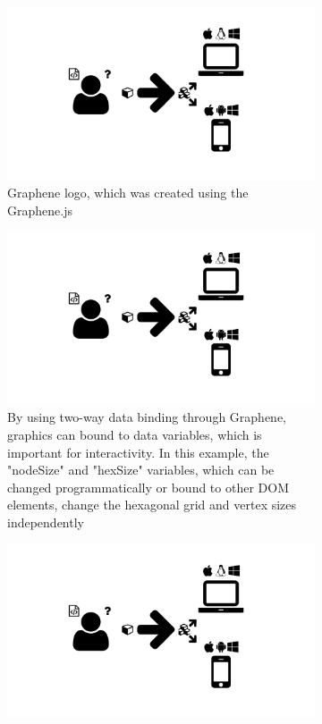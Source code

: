 \begin{figure}
  \centering
  \begin{subfigure}[t]{0.45\textwidth}
    \includegraphics[width=\textwidth,page=4,trim=0.37cm 3.65cm 15cm 5cm, clip=true]{images/Figures.pdf}
    \caption{Graphene logo, which was created using the Graphene.js}
    \label{Figure:graphene-logo}
  \end{subfigure}
  \begin{subfigure}[t]{.45\textwidth}
    \includegraphics[width=\textwidth,page=4,trim=10cm 0cm 0cm 1cm, clip=true]{images/Figures.pdf}
    \caption{By using two-way data binding through Graphene, graphics can bound to data variables, which is important for interactivity.
      In this example, the "nodeSize" and "hexSize" variables, which can be changed programmatically or bound to other DOM elements, change the hexagonal      grid and vertex sizes independently}
    \label{Figure:graphene-data-binding}
  \end{subfigure}
  \begin{subfigure}[b]{\textwidth}
    \includegraphics[width=\textwidth,page=21,trim=0cm 10cm 4cm 0cm, clip=true]{images/Figures.pdf}

\end{subfigure}
\end{figure}
